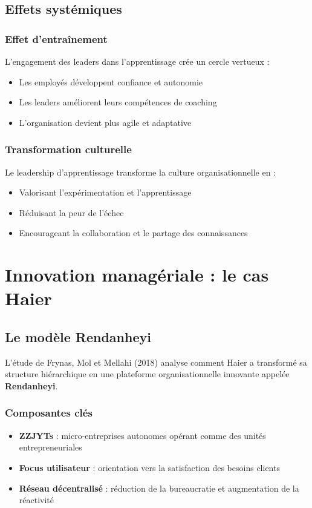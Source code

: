 \documentclass[12pt,a4paper]{article}
\begin{document}
\subsection{Effets systémiques}

\subsubsection{Effet d'entraînement}
L'engagement des leaders dans l'apprentissage crée un cercle vertueux :
\begin{itemize}
    \item Les employés développent confiance et autonomie
    \item Les leaders améliorent leurs compétences de coaching
    \item L'organisation devient plus agile et adaptative
\end{itemize}

\subsubsection{Transformation culturelle}
Le leadership d'apprentissage transforme la culture organisationnelle en :
\begin{itemize}
    \item Valorisant l'expérimentation et l'apprentissage
    \item Réduisant la peur de l'échec
    \item Encourageant la collaboration et le partage des connaissances
\end{itemize}

\section{Innovation managériale : le cas Haier}

\subsection{Le modèle Rendanheyi}

L'étude de Frynas, Mol et Mellahi (2018) analyse comment Haier a transformé sa structure hiérarchique en une plateforme organisationnelle innovante appelée \textbf{Rendanheyi}.

\subsubsection{Composantes clés}
\begin{itemize}
    \item \textbf{ZZJYTs} : micro-entreprises autonomes opérant comme des unités entrepreneuriales
    \item \textbf{Focus utilisateur} : orientation vers la satisfaction des besoins clients
    \item \textbf{Réseau décentralisé} : réduction de la bureaucratie et augmentation de la réactivité
\end{itemize}
\end{document}
